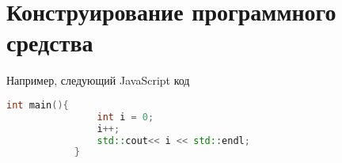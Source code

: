 \section{Конструирование программного средства} 
\label{sec:development}

Например, следующий JavaScript код 
\begin{lstlisting}[language=c++,]
			int main(){
				int i = 0;
				i++;
				std::cout<< i << std::endl;
			}
\end{lstlisting}

